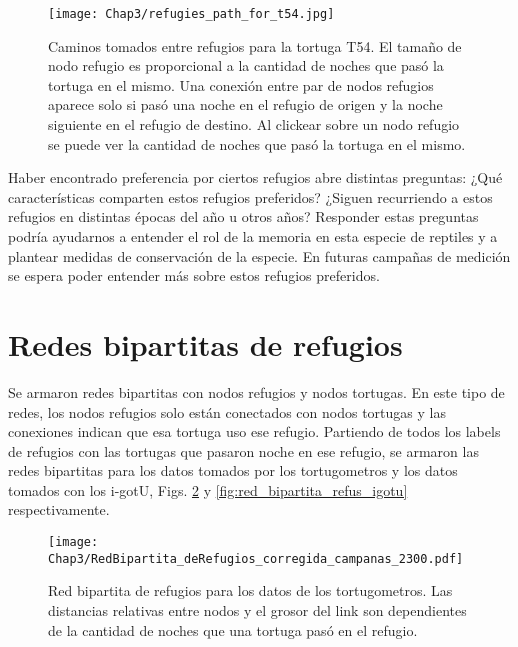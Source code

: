 \begin{figure}[ht]
    \begin{center}
        \texttt{[image: Chap3/refugies\_path\_for\_t54.jpg]}
        \caption[Caminos tomados entre refugios para la tortuga T54.]{Caminos tomados entre refugios para la tortuga T54. El tamaño de nodo refugio es proporcional a la cantidad de noches que pasó la tortuga en el mismo. Una conexión entre par de nodos refugios aparece solo si pasó una noche en el refugio de origen y la noche siguiente en el refugio de destino. Al clickear sobre un nodo refugio se puede ver la cantidad de noches que pasó la tortuga en el mismo.}
        \label{fig:ruta_refus_T54}
       
        \end{center}
\end{figure}
Haber encontrado preferencia por ciertos refugios abre distintas preguntas: ¿Qué características comparten estos refugios preferidos? ¿Siguen recurriendo a estos refugios en distintas épocas del año u otros años?  Responder estas preguntas podría ayudarnos a entender el rol de la memoria en esta especie de reptiles y a plantear medidas de conservación de la especie. En futuras campañas de medición se espera poder entender más sobre estos refugios preferidos.
 
 
 
\section{Redes bipartitas de refugios}
Se armaron redes bipartitas con nodos refugios y nodos tortugas. En este tipo de redes, los nodos refugios solo están conectados con nodos tortugas y las conexiones indican que esa tortuga uso ese refugio. Partiendo de todos los labels de refugios con las tortugas que pasaron noche en ese refugio, se armaron las redes bipartitas para los datos tomados por los tortugometros y los datos tomados con los i-gotU, Figs. \ref{fig:red_bipartita_refus_campanas} y \ref{fig:red_bipartita_refus_igotu} respectivamente.
 
\begin{figure}[ht]
    \begin{center}
        \texttt{[image: Chap3/RedBipartita\_deRefugios\_corregida\_campanas\_2300.pdf]}
        \caption[Red bipartita de refugios para los datos de los tortugometros.]{Red bipartita de refugios para los datos de los tortugometros. Las distancias relativas entre nodos y el grosor del link son dependientes de la cantidad de noches que una  tortuga pasó en el refugio. }
        \label{fig:red_bipartita_refus_campanas}
       
        \end{center}
\end{figure}
 

